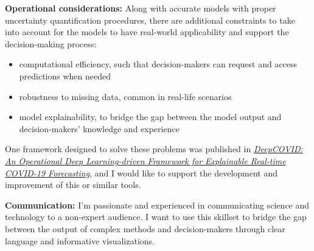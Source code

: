 \documentclass[11pt, a4paper]{awesome-cv}
\begin{document}
\begin{cvletter}
\textbf{Operational considerations:} Along with accurate models with proper uncertainty quantification procedures, there are additional constraints to take into account for the models to have real-world applicability and support the decision-making process:
\begin{itemize}
  \item computational efficiency, such that decision-makers can request and access predictions when needed
  \item robustness to missing data, common in real-life scenarios
  \item model explainability, to bridge the gap between the model output and decision-makers' knowledge and experience
\end{itemize}
One framework designed to solve these problems was published in \href{https://ojs.aaai.org/index.php/AAAI/article/view/17808}{\textit{DeepCOVID: An Operational Deep Learning-driven Framework for Explainable Real-time COVID-19 Forecasting}}, and I would like to support the development and improvement of this or similar tools.
  
\textbf{Communication:} I'm passionate and experienced in communicating science and technology to a non-expert audience. I want to use this skillset to bridge the gap between the output of complex methods and decision-makers through clear language and informative visualizations.

\end{cvletter}

\makeletterclosing
\end{document}
